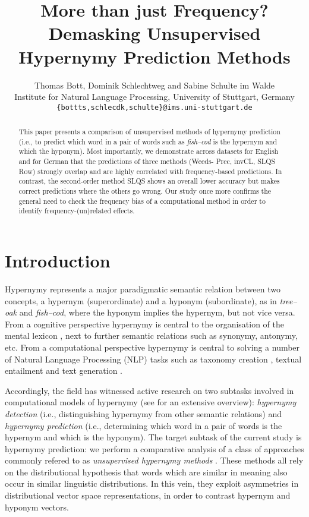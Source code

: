 \documentclass[11pt,a4paper]{article}
\title{More than just Frequency?\\Demasking Unsupervised Hypernymy Prediction Methods}
\author{Thomas Bott, Dominik Schlechtweg and Sabine Schulte im Walde \\
  Institute for Natural Language Processing, University of Stuttgart, Germany \\
  \texttt{\{bottts,schlecdk,schulte\}@ims.uni-stuttgart.de}\\}
\date{}
\begin{document}
\maketitle


\begin{abstract}
  This paper presents a comparison of unsupervised methods of
  hypernymy prediction (i.e., to predict which word in a pair of words
  such as \textit{fish--cod} is the hypernym and which the
  hyponym). Most importantly, we demonstrate across datasets for
  English and for German that the predictions of three methods (Weeds-
  Prec, invCL, SLQS Row) strongly overlap and are highly correlated
  with frequency-based predictions. In contrast, the second-order
  method SLQS shows an overall lower accuracy but makes correct
  predictions where the others go wrong. Our study once more confirms
  the general need to check the frequency bias of a computational
  method in order to identify frequency-(un)related effects.
\end{abstract}


\section{Introduction}

Hypernymy represents a major paradigmatic semantic relation between
two concepts, a hypernym (superordinate) and a hyponym (subordinate),
as in \textit{tree--oak} and \textit{fish--cod}, where the hyponym
implies the hypernym, but not vice versa. From a cognitive perspective
hypernymy is central to the organisation of the mental lexicon
\cite{Deese:65,Miller/Fellbaum:91,Murphy:03}, next to further semantic
relations such as synonymy, antonymy, etc. From a computational
perspective hypernymy is central to solving a number of Natural
Language Processing (NLP) tasks such as taxonomy creation
\cite{Hearst:98,CimianoEtAl:04,SnowEtAl:06,Navigli/Ponzetto:12},
textual entailment \cite{DaganEtAl:06,ClarkEtAl:07} and text generation \citep{Biran/McKeown:13}.

Accordingly, the field has witnessed active research on two subtasks
involved in computational models of hypernymy (see
 for an extensive overview): \textit{hypernymy
  detection} (i.e., distinguishing hypernymy from other semantic
relations) and \textit{hypernymy prediction} (i.e., determining which
word in a pair of words is the hypernym and which is the hyponym). The
target subtask of the current study is hypernymy prediction: we
perform a comparative analysis of a class of approaches commonly
refered to as \textit{unsupervised hypernymy methods}
\cite{WeedsEtAl:04,KotlermanEtAl:10,Clarke:11,Lenci/Benotto:12,SantusEtAl:14}. These
methods all rely on the distributional hypothesis
\cite{Harris:54,Firth:57} that words which are similar in meaning also
occur in similar linguistic distributions. In this vein, they exploit
asymmetries in distributional vector space representations, in order
to contrast hypernym and hyponym vectors.
\end{document}
